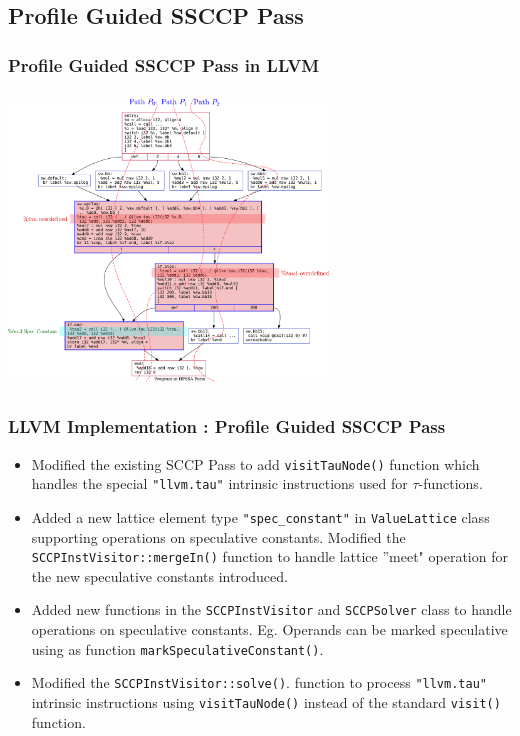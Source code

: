 \documentclass[aspectratio=169, compress]{beamer}
\begin{document}
\subsection{Profile Guided SSCCP Pass}
{
	
}

\begin{frame}
	\frametitle{Profile Guided SSCCP Pass in LLVM}
	\centering
	\includegraphics[width=8.5cm, height=7.8cm]{speculative.pdf} 
\end{frame}
\begin{frame}
	\frametitle{LLVM Implementation : Profile Guided SSCCP Pass}
	\begin{itemize}
		\item Modified the existing SCCP Pass to add \texttt{visitTauNode()} function which handles the special \texttt{"llvm.tau"} intrinsic instructions used for $\tau$-functions.\footnotemark
		\item Added a new lattice element type \texttt{"spec_constant"} in \texttt{ValueLattice} class supporting operations on speculative constants. Modified the \texttt{SCCPInstVisitor::mergeIn()} function to handle lattice ''meet" operation for the new speculative constants introduced.
		\item Added new functions in the \texttt{SCCPInstVisitor} and \texttt{SCCPSolver} class to handle operations on speculative constants. Eg. Operands can be marked speculative using as function \texttt{markSpeculativeConstant()}.
		\item Modified the \texttt{SCCPInstVisitor::solve()}. function to process \texttt{"llvm.tau"} intrinsic instructions using \texttt{visitTauNode()} instead of the standard \texttt{visit()} function.
	\end{itemize}
	\tiny 
\end{frame}
\footnotesize
\end{document}
